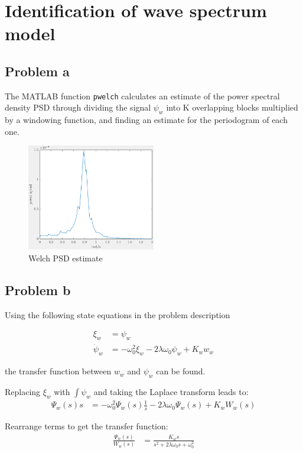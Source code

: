\section{Identification of wave spectrum model}
\subsection{Problem a}
The MATLAB function \texttt{pwelch} calculates an estimate of the power spectral density PSD through
dividing the signal $\psi_w$ into K overlapping blocks multiplied by a windowing function, and finding an
estimate for the periodogram of each one.

\begin{figure}[h]
    \centering
    \includegraphics[width=0.5\textwidth]{images/2a-welchPSDestimate}
    \caption{Welch PSD estimate}
    \label{fig:2a-welchPSDestimate}
\end{figure}

\subsection{Problem b}
Using the following state equations in the problem description \cite{assignment}

\begin{align*}
    \xi_w &= \psi_w \\
    \dot{\psi}_w &= -\omega^2_0\xi_w - 2\lambda\omega_0\psi_w + K_ww_w
\end{align*}

the transfer function between $w_w$ and $\psi_w$ can be found.

Replacing $\xi_w$ with $\int\psi_w$ and taking the Laplace transform leads to:
\begin{align*}
    \Psi_w(s)s &= -\omega^2_0\Psi_w(s)\frac{1}{s} - 2\lambda\omega_0\Psi_w(s) + K_wW_w(s)
\end{align*}

Rearrange terms to get the transfer function:
\begin{align*}
    \frac{\Psi_w(s)}{W_w(s)} &= \frac{K_ws}{s^2 + 2\lambda\omega_0s + \omega^2_0}
\end{align*}


